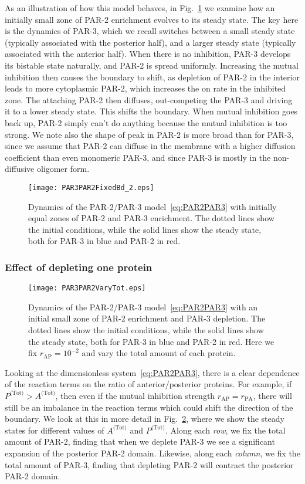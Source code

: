 \documentclass[11pt]{article}
\newcommand{\6}[1]{#1_{\text{6}}}
\newcommand{\3}[1]{#1_{\text{3}}}
\newcommand{\Tot}[1]{#1^\text{(Tot)}}
\begin{document}
As an illustration of how this model behaves, in Fig.\ \ref{fig:P32FixBd} we examine how an initially small zone of PAR-2 enrichment evolves to its steady state. The key here is the dynamics of PAR-3, which we recall switches between a small steady state (typically associated with the posterior half), and a larger steady state (typically associated with the anterior half). When there is no inhibition, PAR-3 develops its bistable state naturally, and PAR-2 is spread uniformly. Increasing the mutual inhibition then causes the boundary to shift, as depletion of PAR-2 in the interior leads to more cytoplasmic PAR-2, which increases the on rate in the inhibited zone. The attaching PAR-2 then diffuses, out-competing the PAR-3 and driving it to a lower steady state. This shifts the boundary. When mutual inhibition goes back up, PAR-2 simply can't do anything because the mutual inhibition is too strong. We note also the shape of peak in PAR-2 is more broad than for PAR-3, since we assume that PAR-2 can diffuse in the membrane with a higher diffusion coefficient than even monomeric PAR-3, and since PAR-3 is mostly in the non-diffusive oligomer form. 

\begin{figure}
\centering
\texttt{[image: PAR3PAR2FixedBd\_2.eps]}
\caption{\label{fig:P32FixBd}Dynamics of the PAR-2/PAR-3 model\ \eqref{eq:PAR2PAR3} with initially equal zones of PAR-2 and PAR-3 enrichment. The dotted lines show the initial conditions, while the solid lines show the steady state, both for PAR-3 in blue and PAR-2 in red.}
\end{figure}

\subsubsection{Effect of depleting one protein}
\begin{figure}
\centering
\texttt{[image: PAR3PAR2VaryTot.eps]}
\caption{\label{fig:P32Dep}Dynamics of the PAR-2/PAR-3 model\ \eqref{eq:PAR2PAR3} with an initial small zone of PAR-2 enrichment and PAR-3 depletion. The dotted lines show the initial conditions, while the solid lines show the steady state, both for PAR-3 in blue and PAR-2 in red. Here we fix $r_\text{AP}=10^{-2}$ and vary the total amount of each protein.}
\end{figure}

Looking at the dimensionless system\ \eqref{eq:PAR2PAR3}, there is a clear dependence of the reaction terms on the ratio of anterior/posterior proteins. For example, if $\Tot{P} > \Tot{A}$, then even if the mutual inhibition strength $r_\text{AP}=r_\text{PA}$, there will still be an imbalance in the reaction terms which could shift the direction of the boundary. We look at this in more detail in Fig.\ \ref{fig:P32Dep}, where we show the steady states for different values of $\Tot{A}$ and $\Tot{P}$. Along each \emph{row}, we fix the total amount of PAR-2, finding that when we deplete PAR-3 we see a significant expansion of the posterior PAR-2 domain. Likewise, along each \emph{column}, we fix the total amount of PAR-3, finding that depleting PAR-2 will contract the posterior PAR-2 domain. 
\end{document}
